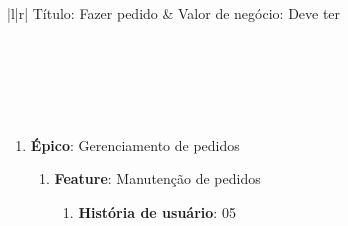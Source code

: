\begin{table}[]
\centering
\label{h04}
\begin{tabular}{|l|r|}
\hline
Título: Fazer pedido                                                          & Valor de negócio: Deve ter                                                         \\ \hline
{}                                                                                                                        \\ \hline
{}                                                                                                           \\ \hline
{}                                                                                           \\ \hline
{} \\ \hline
{}                                                                                                                                      \\ \hline
\end{tabular}
\caption{História de usuário 04}
\end{table}

\begin{enumerate}
	\item \textbf{Épico}: Gerenciamento de pedidos
	\begin{enumerate}
		\item \textbf{Feature}: Manutenção de pedidos
		\begin{enumerate}
		\item \textbf{História de usuário}: 05
		\end{enumerate}
	\end{enumerate}
\end{enumerate}


